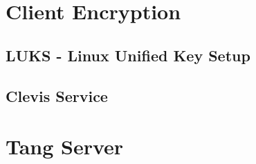 \newpage
\section{Client Encryption}

\newpage
\subsection{LUKS - Linux Unified Key Setup}

\newpage
\subsection{Clevis Service}

\newpage
\section{Tang Server}

\newpage